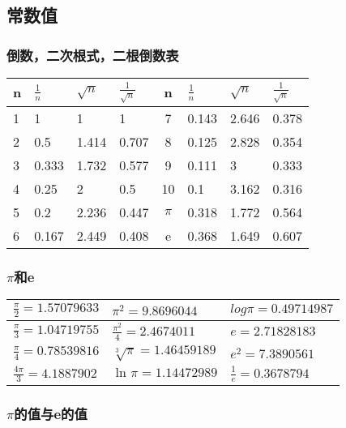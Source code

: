 \documentclass[UTF8]{ctexart}
\begin{document}
\subsection{常数值}
\subsubsection{倒数，二次根式，二根倒数表}


    \begin{table}[H]
    \begin{tabular}{|l|l|l|l|c|l|l|l|}
\hline
n & $\frac{1}{n}$ & $\sqrt{n}$ & $\frac{1}{\sqrt{n}}$ & n & $\frac{1}{n}$ & $\sqrt{n}$ &
$\frac{1}{\sqrt{n}}$ \\ \hline
1 & 1 & 1 & 1 & 7 & 0.143 & 2.646 & 0.378 \\ \cline{1-1} \cline{5-5}
2 & 0.5 & 1.414 & 0.707 & 8 & 0.125 & 2.828 & 0.354 \\ \cline{1-1} \cline{5-5}
3 & 0.333 & 1.732 & 0.577 & 9 & 0.111 & 3 & 0.333 \\ \cline{1-1} \cline{5-5}
4 & 0.25 & 2 & 0.5 & 10 & 0.1 & 3.162 & 0.316 \\ \cline{1-1} \cline{5-5}
5 & 0.2 & 2.236 & 0.447 & $\pi$ & 0.318 & 1.772 & 0.564 \\ \cline{1-1} \cline{5-5}
6 & 0.167 & 2.449     & 0.408       & e  & 0.368 & 1.649     & 0.607       \\ \hline
\end{tabular}
\end{table}

\subsubsection{$\pi$和e}

\begin{table}[H]
\begin{tabular}{|l|l|l|}
\hline
$\frac{\pi }{2} =1.57079633$ & $\pi^2=9.8696044$  & $log \pi =0.49714987$ \\ \hline
$\frac{\pi }{3} =1.04719755$ & $\frac{\pi^2}{4}=2.4674011$  & $e=2.71828183$ \\ \hline
$\frac{\pi }{4} =0.78539816$ & $\sqrt[3]{\pi}=1.46459189$ & $e^2=7.3890561$  \\ \hline
$\frac{4\pi }{3} =4.1887902$ & $\ln_{}{\pi} =1.14472989$ & $\frac{1}{e}=0.3678794$ \\ \hline
\end{tabular}
\end{table}

\subsubsection{$\pi$的值与e的值}
\end{document}
